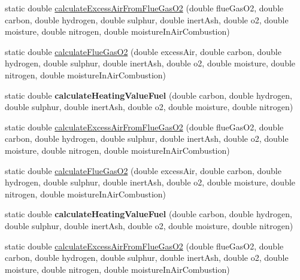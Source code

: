\begin{DoxyCompactItemize}
\item 
static double \hyperlink{class_solid_liquid_flue_gas_material_a57ddf04184687f8efe031986b591ad6b}{calculate\+Excess\+Air\+From\+Flue\+Gas\+O2} (double flue\+Gas\+O2, double carbon, double hydrogen, double sulphur, double inert\+Ash, double o2, double moisture, double nitrogen, double moisture\+In\+Air\+Combustion)
\item 
static double \hyperlink{class_solid_liquid_flue_gas_material_a39dbc6f412ce2ec739ed8107fbdc68a7}{calculate\+Flue\+Gas\+O2} (double excess\+Air, double carbon, double hydrogen, double sulphur, double inert\+Ash, double o2, double moisture, double nitrogen, double moisture\+In\+Air\+Combustion)
\item 
\mbox{\label{class_solid_liquid_flue_gas_material_aa6f11cd466965e30af4f8c30d7a5f402}} 
static double {\bfseries calculate\+Heating\+Value\+Fuel} (double carbon, double hydrogen, double sulphur, double inert\+Ash, double o2, double moisture, double nitrogen)
\item 
static double \hyperlink{class_solid_liquid_flue_gas_material_abecacec1d6f108a8cdf002a9f67972c7}{calculate\+Excess\+Air\+From\+Flue\+Gas\+O2} (double flue\+Gas\+O2, double carbon, double hydrogen, double sulphur, double inert\+Ash, double o2, double moisture, double nitrogen, double moisture\+In\+Air\+Combustion)
\item 
static double \hyperlink{class_solid_liquid_flue_gas_material_a33152fce2511a4db7240461a7de950a5}{calculate\+Flue\+Gas\+O2} (double excess\+Air, double carbon, double hydrogen, double sulphur, double inert\+Ash, double o2, double moisture, double nitrogen, double moisture\+In\+Air\+Combustion)
\item 
\mbox{\label{class_solid_liquid_flue_gas_material_a301ff1dc16086e191638b881a553539d}} 
static double {\bfseries calculate\+Heating\+Value\+Fuel} (double carbon, double hydrogen, double sulphur, double inert\+Ash, double o2, double moisture, double nitrogen)
\item 
static double \hyperlink{class_solid_liquid_flue_gas_material_abecacec1d6f108a8cdf002a9f67972c7}{calculate\+Excess\+Air\+From\+Flue\+Gas\+O2} (double flue\+Gas\+O2, double carbon, double hydrogen, double sulphur, double inert\+Ash, double o2, double moisture, double nitrogen, double moisture\+In\+Air\+Combustion)

\end{DoxyCompactItemize}

